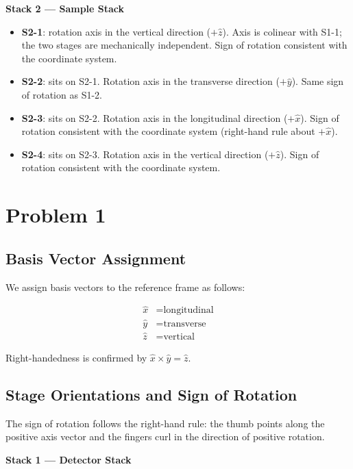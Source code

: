 \documentclass[12pt]{article}
\begin{document}
\textbf{Stack 2 --- Sample Stack}

\begin{itemize}
  \item \textbf{S2-1}: rotation axis in the vertical direction ($+\hat{z}$).
    Axis is colinear with S1-1; the two stages are mechanically independent.
    Sign of rotation consistent with the coordinate system.
  \item \textbf{S2-2}: sits on S2-1. Rotation axis in the transverse direction ($+\hat{y}$).
    Same sign of rotation as S1-2.
  \item \textbf{S2-3}: sits on S2-2. Rotation axis in the longitudinal direction ($+\hat{x}$).
    Sign of rotation consistent with the coordinate system (right-hand rule about $+\hat{x}$).
  \item \textbf{S2-4}: sits on S2-3. Rotation axis in the vertical direction ($+\hat{z}$).
    Sign of rotation consistent with the coordinate system.
\end{itemize}

\section*{Problem 1}

\subsection*{Basis Vector Assignment}

We assign basis vectors to the reference frame as follows:

\begin{align*}
\hat{x} &= \text{longitudinal} \\
\hat{y} &= \text{transverse} \\
\hat{z} &= \text{vertical}
\end{align*}

Right-handedness is confirmed by $\hat{x} \times \hat{y} = \hat{z}$.

\subsection*{Stage Orientations and Sign of Rotation}

The sign of rotation follows the right-hand rule: the thumb points along the
positive axis vector and the fingers curl in the direction of positive rotation.

\textbf{Stack 1 --- Detector Stack}
\end{document}
